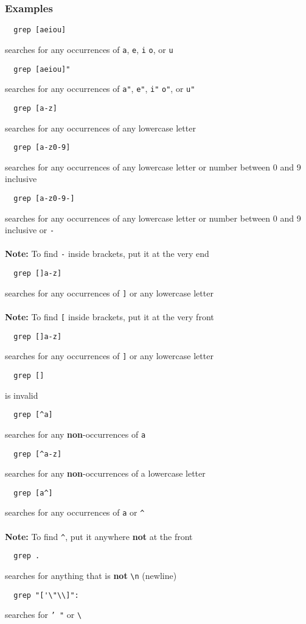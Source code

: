 \documentclass[13pt]{article}
\begin{document}
\subsubsection*{Examples}
\begin{verbatim}
  grep [aeiou] \end{verbatim}
searches for any occurrences of \texttt{a}, \texttt{e}, \texttt{i} \texttt{o}, or \texttt{u}
\begin{verbatim}
  grep [aeiou]" \end{verbatim}
searches for any occurrences of \texttt{a"}, \texttt{e"}, \texttt{i"} \texttt{o"}, or \texttt{u"}
\begin{verbatim}
  grep [a-z] \end{verbatim}
searches for any occurrences of any lowercase letter
\begin{verbatim}
  grep [a-z0-9] \end{verbatim}
searches for any occurrences of any lowercase letter or number between 0 and 9 inclusive
\begin{verbatim}
  grep [a-z0-9-] \end{verbatim}
searches for any occurrences of any lowercase letter or number between 0 and 9 inclusive or \texttt{-} \\ \\
\textbf{Note:} To find \texttt{-} inside brackets, put it at the very end
\begin{verbatim}
  grep []a-z] \end{verbatim}
searches for any occurrences of \texttt{]} or any lowercase letter \\ \\
\textbf{Note:} To find \texttt{[} inside brackets, put it at the very front
\begin{verbatim}
  grep []a-z] \end{verbatim}
searches for any occurrences of \texttt{]} or any lowercase letter
\begin{verbatim}
  grep [] \end{verbatim}
is invalid
\begin{verbatim}
  grep [^a] \end{verbatim}
searches for any \textbf{non}-occurrences of \texttt{a}
\begin{verbatim}
  grep [^a-z] \end{verbatim}
searches for any \textbf{non}-occurrences of a lowercase letter
\begin{verbatim}
  grep [a^] \end{verbatim}
searches for any occurrences of \texttt{a} or \texttt{\^} \\ \\
\textbf{Note:} To find \texttt{\^}, put it anywhere \textbf{not} at the front
\begin{verbatim}
  grep . \end{verbatim}
searches for anything that is \textbf{not} \texttt{\textbackslash n} (newline)
\begin{verbatim}
  grep "['\"\\]": \end{verbatim}
searches for \texttt{' "} or \texttt{\textbackslash}    
\end{document}
